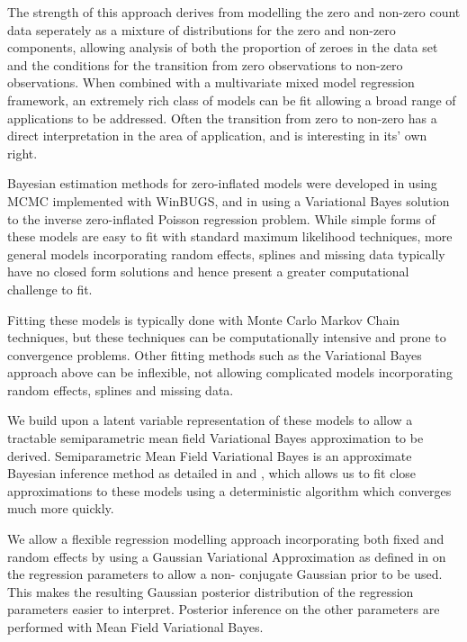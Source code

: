 The strength of this approach derives from modelling the zero and non-zero
count data seperately as a mixture of distributions for the zero and non-zero
components, allowing analysis of both the proportion of zeroes in the data set
and the conditions for the transition from zero observations to non-zero
observations. When combined with a multivariate mixed model regression
framework, an extremely rich class of models can be fit allowing a broad range
of applications to be addressed. Often the transition from zero to non-zero has
a direct interpretation in the area of application, and is interesting in its'
own right.

Bayesian estimation methods for zero-inflated models were developed in
\cite{Ghosh2006} using MCMC implemented with WinBUGS, and in \cite{Vatsa2014}
using a Variational Bayes solution to the inverse zero-inflated Poisson
regression problem. While simple forms of these models are easy to fit with
standard  maximum likelihood techniques, more general models incorporating
random effects, splines and missing data  typically have no closed form
solutions and hence present a greater computational challenge to fit.

Fitting these models is typically done with Monte Carlo Markov Chain
techniques, but these techniques can be computationally intensive and prone to
convergence problems.  Other fitting methods such as the Variational Bayes
approach above can be inflexible, not allowing complicated models incorporating
random effects, splines and missing data.

We build upon a latent variable representation of these models to allow a
tractable semiparametric mean field Variational Bayes approximation to be
derived. Semiparametric Mean Field Variational Bayes is an approximate Bayesian
inference method as detailed in \cite{Ormerod2010} and \cite{Rohde2015}, which
allows us to fit close approximations to these models using a deterministic
algorithm which converges much more quickly.

We allow a flexible regression modelling approach incorporating both fixed and
random effects by using a Gaussian Variational Approximation as defined in
\cite{Ormerod2012} on the regression parameters to allow a non- conjugate
Gaussian prior to be used. This makes the resulting Gaussian posterior
distribution of the regression parameters easier to interpret. Posterior
inference on the other parameters are performed with Mean Field Variational
Bayes.


